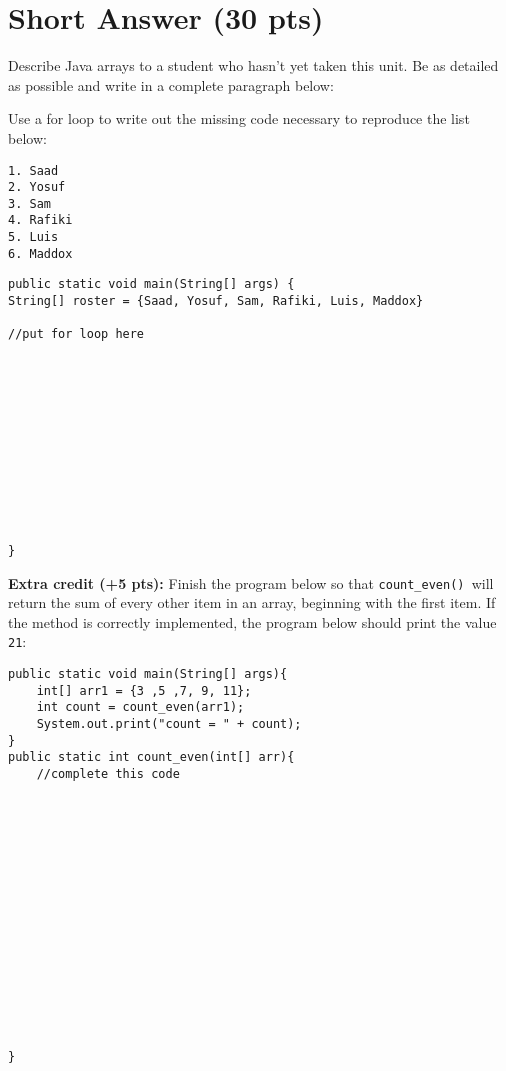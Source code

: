 \documentclass{exam}
\begin{document}
\section*{Short Answer (30 pts)}
\begin{center}
\end{center}
\begin{questions}
\question
Describe Java arrays to a student who hasn't yet taken this unit. Be as detailed as possible and write in a complete paragraph below:

\makeemptybox{3in}


\question

Use a for loop to write out the missing code necessary to reproduce the list below:


\begin{lstlisting}
1. Saad 
2. Yosuf
3. Sam 
4. Rafiki
5. Luis
6. Maddox
\end{lstlisting}



\begin{lstlisting}
public static void main(String[] args) {
String[] roster = {Saad, Yosuf, Sam, Rafiki, Luis, Maddox}

//put for loop here 












}
\end{lstlisting}

\question

\textbf{Extra credit (+5 pts): } Finish the program below so that \texttt{count\_even() }will return the sum of every other item in an array, beginning with the first item. If the method is correctly implemented, the program below should print  the value \texttt{21}:

\begin{lstlisting}
public static void main(String[] args){
	int[] arr1 = {3 ,5 ,7, 9, 11};
	int count = count_even(arr1);
	System.out.print("count = " + count);
}
public static int count_even(int[] arr){
	//complete this code
	
	
	
	
	
	
	
	
	
	
	
	
	
	
	
	
}

\end{lstlisting}







\end{questions}
\end{document}

